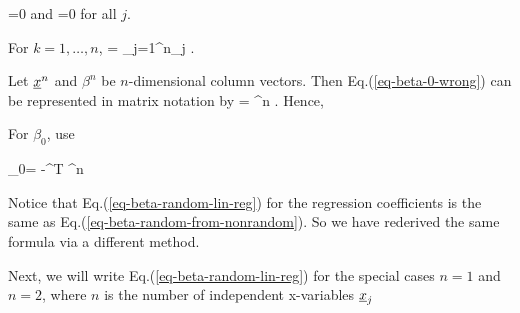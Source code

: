 \beq
\av{\rveps}=0
\eeq
and
\beq
{}=0
\eeq
for all $j$.

For $k=1, \ldots, n$,
\beq
{}
=
\sum_{j=1}^{n}\beta_j
\;.
\label{eq-beta-0-wrong}
\eeq

Let ${\underline{x}}^n$ and $\beta^n$ be
$n$-dimensional column vectors.
Then Eq.(\ref{eq-beta-0-wrong})
can be represented
 in matrix notation by
\beq
{}=
\beta^n
\;.
\eeq
Hence,

\beq
{}
\label{eq-beta-random-lin-reg}
\eeq
For $\beta_0$, use

\beq
\beta_0=
\av{\rvy}-^T \beta^n
\eeq

Notice that
Eq.(\ref{eq-beta-random-lin-reg})
for the regression coefficients
is the same
as Eq.(\ref{eq-beta-random-from-nonrandom}).
So we have rederived the same formula
via a different method.


Next, we will
write
 Eq.(\ref{eq-beta-random-lin-reg})
for the special cases
$n=1$ and $n=2$,
where $n$ is the
number of independent x-variables ${\underline{x}}_j$

